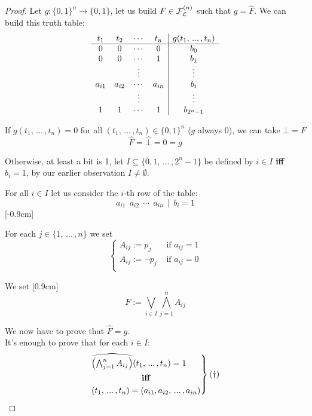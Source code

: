 	\begin{proof}
		Let $g: \{0,1\}^n \rightarrow \{0,1\}$, let us build $F \in \mathcal{F}_\mathcal{L}^{(n)}$ such that $g = \hat F$. We can build this truth table:
		$$
		\begin{array}{c c c c | c}
			t_1 & t_2 & \cdots & t_n & g (t_1, \, ... \, , t_n) \\
			\hline
			0 & 0 & \cdots & 0 & b_0 \\
			0 & 0 & \cdots & 1 & b_1 \\
			&& \vdots && \vdots \\
			a_{i1} & a_{i2} & \cdots & a_{in} & b_i \\
			&& \vdots && \vdots \\
			1 & 1 & \cdots & 1 & b_{2^{n}-1} \\
		\end{array}
		$$

		\begin{osservation*}
		If $g(t_1, \, ... \, , t_n) = 0$ for all $(t_1, \, ... \, , t_n) \in \{0,1\}^n$ ($g$ always $0$), we can take $\bot = F$
		$$ \hat F = \hat \bot = 0 = g $$
		\end{osservation*}

		\noindent
		Otherwise, at least a bit is 1, let $I \subseteq \{0,1, \, ... \, , 2^{n}-1\}$ be defined by $i \in I$ \textbf{iff} $b_i = 1$, by our earlier observation $I \neq \emptyset$.

		\noindent
		For all $i \in I$ let us consider the $i$-th row of the table:
		$$ a_{i1} \ \ a_{i2} \ \ \cdots \ \ a_{in} \ \ | \ \ b_i = 1$$ [-0.9cm]
		\vspace{-0.75cm}

		\noindent
		For each $j \in \{1, \, ... \, , n\}$ we set
		$$
		\begin{cases}
			A_{ij}:= p_j & \text{ if } a_{ij} = 1 \\
			A_{ij}:= \neg p_j & \text{ if } a_{ij} = 0 \\
		\end{cases}
		$$

		\noindent
		We set [0.9cm]
		$$ F := \bigvee_{i \in I} \bigwedge_{j=1}^n A_{ij} $$

		\noindent
		We now have to prove that $\hat F = g$.\\

		\noindent
		It's enough to prove that for each $i \in I$:
		\begin{equation*}
		  \begin{rcases}
			\widehat{\left(\bigwedge_{j=1}^n A_{ij}\right)} (t_1, \, ... \, , t_n) = 1 \\
			\quad\quad\quad\quad\quad\quad \textbf{iff} \\
			(t_1, \, ... \, , t_n) =  (a_{i1}, a_{i2}, \, ... \, , a_{in})
		  \end{rcases}
		  (\dag)
		\end{equation*}


\end{proof}

